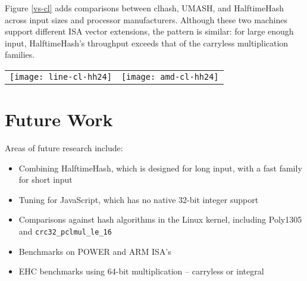 \documentclass{llncs}
\begin{document}
Figure \ref{vs-cl} adds comparisons between clhash, UMASH, and HalftimeHash across input sizes and processor manufacturers.
Although these two machines support different ISA vector extensions, the pattern is similar: for large enough input, HalftimeHash's throughput exceeds that of the carryless multiplication families.
\begin{figure*}
\begin{tabular}{cc}
\texttt{[image: line-cl-hh24]}
&
\texttt{[image: amd-cl-hh24]}
\end{tabular}
\caption{
  \label{vs-cl}
  Comparison of Intel (i7-7800x) and AMD (EC2 c5a.large, 7R32) performance.
  On both chips HalftimeHash24 is faster than clhash and UMASH for long strings.
  The ``v3'' after the name of the AMD HalftimeHash indicates block size: v3 means a 256-bit block size, while v4 (the default) means 512-bit block size.
  AMD chips do not support AVX-512, but still HalftimeHash with 256-bit blocks exceeds the speed of clmul-based hashing methods by up to a factor of 2.
}
\end{figure*}

\section{Future Work}

Areas of future research include:

\begin{itemize}
\item Combining HalftimeHash, which is designed for long input, with a fast family for short input
\item Tuning for JavaScript, which has no native 32-bit integer support
\item Comparisons against hash algorithms in the Linux kernel, including Poly1305 and \texttt{crc32\_pclmul\_le\_16}
\item Benchmarks on POWER and ARM ISA's
\item EHC benchmarks using 64-bit multiplication -- carryless or integral
\end{itemize}


\end{document}
